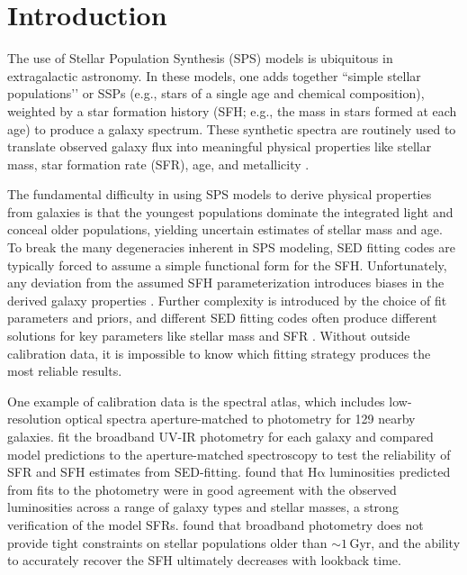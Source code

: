 \documentclass[preprint2]{aastex62}
\newcommand{\ha}{\ensuremath{\mathrm{H\alpha}}\xspace}
\newcommand{\Gyr}{$\,$Gyr\xspace}
\begin{document}
\section{Introduction} \label{sec:intro}

The use of Stellar Population Synthesis (SPS) models is ubiquitous in extragalactic astronomy. In these models, one adds together ``simple stellar populations’’ or SSPs (e.g., stars of a single age and chemical composition), weighted by a star formation history (SFH; e.g., the mass in stars formed at each age) to produce a galaxy spectrum. These synthetic spectra are routinely used to translate observed galaxy flux into meaningful physical properties like stellar mass, star formation rate (SFR), age, and metallicity \citep[see reviews in][]{Walcher+2011, Conroy+2013}.

The fundamental difficulty in using SPS models to derive physical properties from galaxies is that the youngest populations dominate the integrated light and conceal older populations, yielding uncertain estimates of stellar mass and age. To break the many degeneracies inherent in SPS modeling, SED fitting codes are typically forced to assume a simple functional form for the SFH. Unfortunately, any deviation from the assumed SFH parameterization introduces biases in the derived galaxy properties \citep[e.g., ][]{Lee+2009, Maraston+2010, Pforr+2012}.  Further complexity is introduced by the choice of fit parameters and priors, and different SED fitting codes often produce different solutions for key parameters like stellar mass and SFR \citep[e.g, ][]{Santini+2015, Goddard+2017, Li+2017, Ge+2018}. Without outside calibration data, it is impossible to know which fitting strategy produces the most reliable results.

One example of calibration data is the \citet{Brown+2014} spectral atlas, which includes low-resolution optical spectra aperture-matched to photometry for 129 nearby galaxies. \citet{Leja+2017} fit the broadband UV-IR photometry for each galaxy and compared model predictions to the aperture-matched spectroscopy to test the reliability of SFR and SFH estimates from SED-fitting. \citeauthor{Leja+2017} found that \ha luminosities predicted from fits to the photometry were in good agreement with the observed luminosities across a range of galaxy types and stellar masses, a strong verification of the model SFRs. \citeauthor{Leja+2017} found that broadband photometry does not provide tight constraints on stellar populations older than $\sim1$\Gyr, and the ability to accurately recover the SFH ultimately decreases with lookback time.
\end{document}
